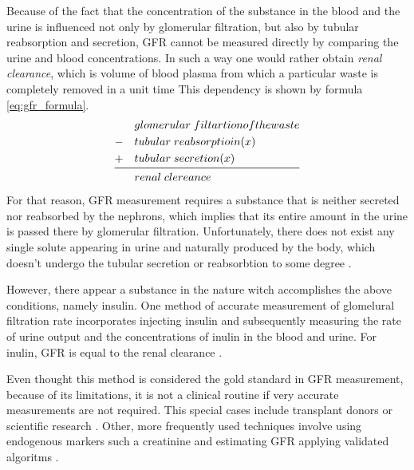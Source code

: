 Because of the fact that the concentration of the substance in the blood and the urine is influenced not only by glomerular filtration, but also by tubular reabsorption and secretion, GFR cannot be measured directly by comparing the urine and blood concentrations. In such a way one would rather obtain \textit{renal clearance}, which is volume of blood plasma from which a particular waste is completely removed in a unit time \cite{saladin} This dependency is shown by formula \ref{eq:gfr_formula}.
\begin{equation}
\begin{aligned}
&glomerular\;filtartion of the waste\\
-\quad&tubular\;reabsorptioin(x)\\
+\quad&tubular\;secretion(x)\\
\midrule
&renal\;clereance
\end{aligned}	
\label{eq:gfr_formula}
\end{equation}
For that reason, GFR measurement requires
a substance that is neither secreted nor reabsorbed by the nephrons, which implies that its entire amount in the urine is passed there by glomerular filtration. Unfortunately, there does not exist any single solute appearing in urine and naturally produced by the body, which doesn't undergo the tubular secretion or reabsorbtion to some degree \cite{delanaye2012measuring}. 

However, there appear a substance in the nature witch accomplishes the above conditions, namely insulin. One method of accurate measurement of glomelural filtration rate incorporates injecting insulin and subsequently measuring the rate of urine output and the concentrations of inulin in the blood and urine. For inulin, GFR is equal to the renal clearance \cite{saladin, delanaye2012measuring}.


Even thought this method is considered the gold standard in GFR measurement, because of its limitations, it is not a clinical routine if very accurate measurements are not required. This special cases include transplant donors or scientific research \cite{traynor2006measure}. 
Other, more frequently used techniques involve using endogenous markers such a creatinine and estimating GFR applying validated algoritms \cite{delanaye2012measuring}. 
 